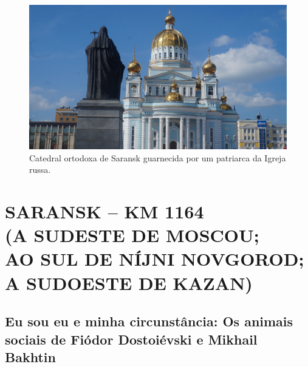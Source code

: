 \clearpage
\thispagestyle{empty}

\movetoevenpage
\begin{absolutelynopagebreak}
\begin{vplace}
\begin{figure}[H]
\begin{adjustwidth}{-1.8cm}{}
  \vspace{2.7cm}
  \includegraphics[width=130mm]{./imgs/saransk1.jpg}  
\end{adjustwidth}
  \caption{Catedral ortodoxa de Saransk guarnecida por um patriarca da Igreja russa.}

\thispagestyle{empty}

\end{figure}
\end{vplace}

\end{absolutelynopagebreak}

\movetooddpage
{}
\part*{SARANSK -- KM 1164\\(A SUDESTE DE MOSCOU;\\AO SUL DE NÍJNI NOVGOROD;\\A SUDOESTE DE KAZAN)}


\chapter*{Eu sou eu e minha circunstância: Os animais sociais de Fiódor Dostoiévski e Mikhail Bakhtin}

